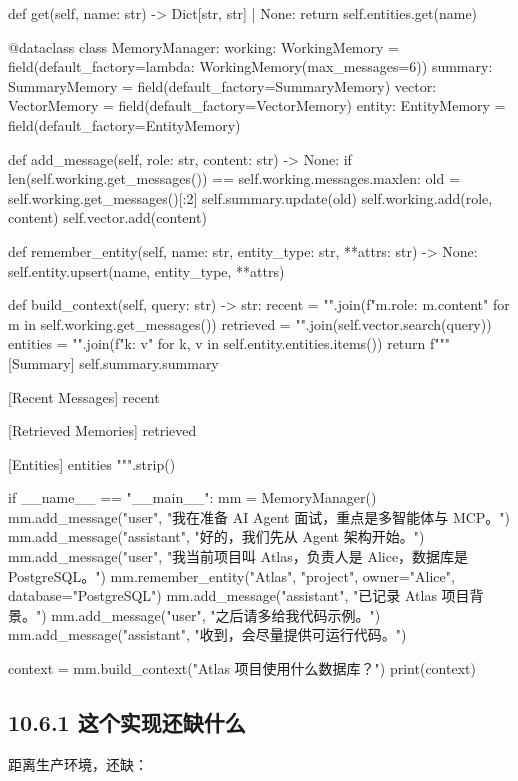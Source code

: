\begin{codeblock}
    def get(self, name: str) -> Dict[str, str] | None:
        return self.entities.get(name)


@dataclass
class MemoryManager:
    working: WorkingMemory = field(default_factory=lambda: WorkingMemory(max_messages=6))
    summary: SummaryMemory = field(default_factory=SummaryMemory)
    vector: VectorMemory = field(default_factory=VectorMemory)
    entity: EntityMemory = field(default_factory=EntityMemory)

    def add_message(self, role: str, content: str) -> None:
        if len(self.working.get_messages()) == self.working.messages.maxlen:
            old = self.working.get_messages()[:2]
            self.summary.update(old)
        self.working.add(role, content)
        self.vector.add(content)

    def remember_entity(self, name: str, entity_type: str, **attrs: str) -> None:
        self.entity.upsert(name, entity_type, **attrs)

    def build_context(self, query: str) -> str:
        recent = "\n".join(f"{m.role}: {m.content}" for m in self.working.get_messages())
        retrieved = "\n".join(self.vector.search(query))
        entities = "\n".join(f"{k}: {v}" for k, v in self.entity.entities.items())
        return f"""
[Summary]
{self.summary.summary}

[Recent Messages]
{recent}

[Retrieved Memories]
{retrieved}

[Entities]
{entities}
""".strip()


if __name__ == "__main__":
    mm = MemoryManager()
    mm.add_message("user", "我在准备 AI Agent 面试，重点是多智能体与 MCP。")
    mm.add_message("assistant", "好的，我们先从 Agent 架构开始。")
    mm.add_message("user", "我当前项目叫 Atlas，负责人是 Alice，数据库是 PostgreSQL。")
    mm.remember_entity("Atlas", "project", owner="Alice", database="PostgreSQL")
    mm.add_message("assistant", "已记录 Atlas 项目背景。")
    mm.add_message("user", "之后请多给我代码示例。")
    mm.add_message("assistant", "收到，会尽量提供可运行代码。")

    context = mm.build_context("Atlas 项目使用什么数据库？")
    print(context)
\end{codeblock}

\subsection{10.6.1 这个实现还缺什么}

距离生产环境，还缺：


